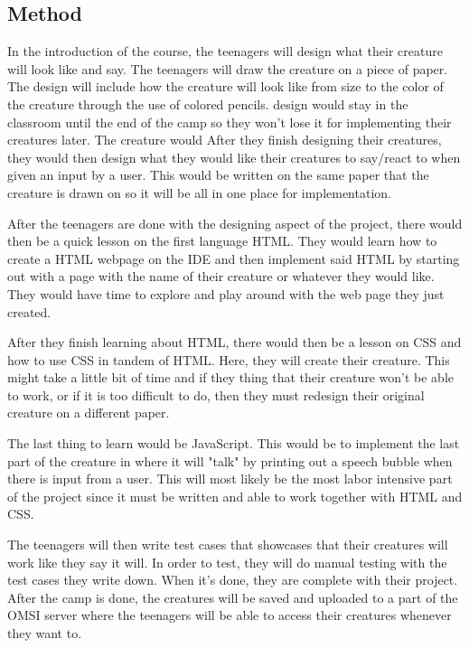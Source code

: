 \documentclass[10pt,a4paper,onecolumn,draftclsnofoot]{IEEEtran}
\begin{document}
\subsection*{Method}
In the introduction of the course, the teenagers will design what their creature will look like and say. The teenagers will draw the creature on a piece of paper. The design will include how the creature will look like from size to the color of the creature through the use of colored pencils. design would stay in the classroom until the end of the camp so they won't lose it for implementing their creatures later. The creature would  After they finish designing their creatures, they would then design what they would like their creatures to say/react to when given an input by a user. This would be written on the same paper that the creature is drawn on so it will be all in one place for implementation.

After the teenagers are done with the designing aspect of the project, there would then be a quick lesson on the first language HTML. They would learn how to create a HTML webpage on the IDE and then implement said HTML by starting out with a page with the name of their creature or whatever they would like. They would have time to explore and play around with the web page they just created. 

After they finish learning about HTML, there would then be a lesson on CSS and how to use CSS in tandem of HTML. Here, they will create their creature. This might take a little bit of time and if they thing that their creature won't be able to work, or if it is too difficult to do, then they must redesign their original creature on a different paper.

The last thing to learn would be JavaScript. This would be to implement the last part of the creature in where it will "talk" by printing out a speech bubble when there is input from a user. This will most likely be the most labor intensive part of the project since it must be written and able to work together with HTML and CSS.

The teenagers will then write test cases that showcases that their creatures will work like they say it will. In order to test, they will do manual testing with the test cases they write down. When it's done, they are complete with their project. After the camp is done, the creatures will be saved and uploaded to a part of the OMSI server where the teenagers will be able to access their creatures whenever they want to.
\end{document}
